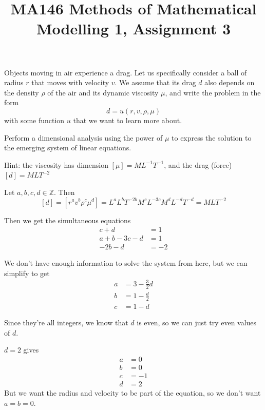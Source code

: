 \documentclass[a4paper]{article}
\title{MA146 Methods of Mathematical Modelling 1, Assignment 3}
\begin{document}
\maketitle

\setlength{\parindent}{0em}
\setlength{\parskip}{1em}


\begin{questionbody}
Objects moving in air experience a drag. Let us specifically consider a ball of radius $r$ that moves with velocity $v$. We assume that its drag $d$ also depends on the density $\rho$ of the air and its dynamic viscosity $\mu$, and write the problem in the form \[
d = u(r, v, \rho, \mu)
\] with some function $u$ that we want to learn more about.

Perform a dimensional analysis using the power of $\mu$ to express the solution to the emerging system of linear equations.

Hint: the viscosity has dimension $[\mu] = M L^{-1} T^{-1}$, and the drag (force) $[d] = M L T^{-2}$
\end{questionbody}

Let $a, b, c, d \in \mathbb Z$. Then \[ [d] = \left[ r^a v^b \rho^c \mu^d \right] = L^a L^b T^{-2b} M^c L^{-3c} M^d L^{-d} T^{-d} = MLT^{-2} \]

Then we get the simultaneous equations \begin{align*}
    c + d &= 1 \\
    a + b - 3c - d &= 1 \\
    -2b - d &= -2
\end{align*}

We don't have enough information to solve the system from here, but we can simplify to get \begin{align*}
    a &= 3 - \frac32 d \\
    b &= 1 - \frac d2 \\
    c &= 1 - d
\end{align*}

Since they're all integers, we know that $d$ is even, so we can just try even values of $d$.

$d=2$ gives \begin{align*}
    a &= 0 \\
    b &= 0 \\
    c &= -1 \\
    d &= 2
\end{align*}
But we want the radius and velocity to be part of the equation, so we don't want $a=b=0$.
\end{document}
